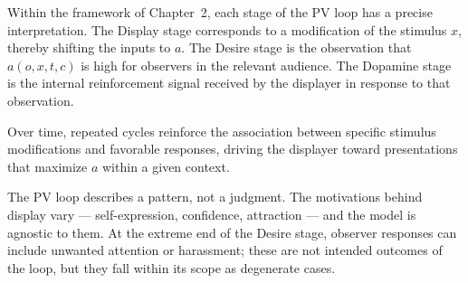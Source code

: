 Within the framework of Chapter~2, each stage of the PV loop has a precise interpretation.
The Display stage corresponds to a modification of the stimulus $x$, thereby shifting the inputs to $a$.
The Desire stage is the observation that $a(o, x, t, c)$ is high for observers in the relevant audience.
The Dopamine stage is the internal reinforcement signal received by the displayer in response to that observation.

Over time, repeated cycles reinforce the association between specific stimulus modifications and favorable responses, driving the displayer toward presentations that maximize $a$ within a given context.

\begin{remark}
The PV loop describes a pattern, not a judgment.
The motivations behind display vary --- self-expression, confidence, attraction --- and the model is agnostic to them.
At the extreme end of the Desire stage, observer responses can include unwanted attention or harassment; these are not intended outcomes of the loop, but they fall within its scope as degenerate cases.
\end{remark}
